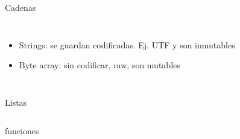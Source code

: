  \begin{frame}{Cadenas}
    \begin{columns}
       \begin{itemize}
          \item{Strings: se guardan codificadas. Ej. UTF y son inmutables}
          \item{Byte array: sin codificar, raw, son mutables}
       \end{itemize}
       
    \end{columns}
    \vfill
 \end{frame}
 \begin{frame}{Listas}
    \begin{columns}
       
       
    \end{columns}
    \vfill
 \end{frame}
 \begin{frame}{funciones}
       
    \vfill
 \end{frame}


